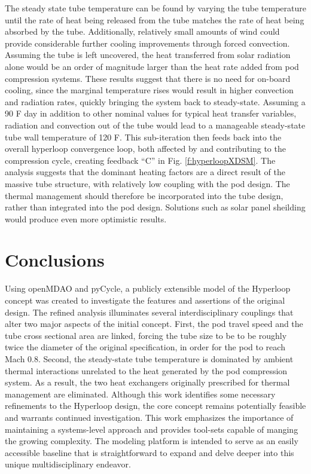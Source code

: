 \documentclass[heading.tex]{subfiles}
\begin{document}
The steady state tube temperature can be found by varying the tube temperature until the
rate of heat being released from the tube matches the rate of heat being absorbed by the tube.
Additionally, relatively small amounts of wind could provide
considerable further cooling improvements through forced convection.
Assuming the tube is left uncovered, the heat transferred from solar radiation alone would be an order of
magnitude larger than the heat rate added from pod compression systems.
These results suggest that there is no need for on-board cooling, since the marginal temperature
rises would result in higher convection and radiation rates, quickly bringing the system back to steady-state.
Assuming a 90 \degree F day in addition to other nominal values for typical heat transfer variables,
radiation and convection out of the tube would lead to a manageable steady-state tube wall temperature of 120 \degree F.
This sub-iteration then feeds back into the overall hyperloop convergence loop, both affected by
and contributing to the compression cycle, creating feedback “C” in Fig. \ref{f:hyperloopXDSM}.
The analysis suggests that the dominant heating factors are a direct result of the massive tube structure,
with relatively low coupling with the pod design.
The thermal management should therefore be incorporated into the tube design, rather than integrated into the pod design.
Solutions such as solar panel sheilding would produce even more optimistic results.


\section{Conclusions}

Using openMDAO and pyCycle, a publicly extensible model of the Hyperloop concept was created 
to investigate the features and assertions of the original design. 
The refined analysis illuminates several
interdisciplinary couplings that alter two major aspects of the initial concept.
First, the pod travel speed and the tube cross sectional area are linked, forcing 
the tube size to be to be roughly twice the diameter of the original specification, in order for the 
pod to reach Mach 0.8. Second, the steady-state tube temperature is dominated by ambient thermal interactions
unrelated to the heat generated by the pod compression system.
As a result, the two heat exchangers originally prescribed for thermal management are eliminated.
Although this work identifies some necessary refinements to the Hyperloop design, the core 
concept remains potentially feasible and warrants continued investigation. 
This work emphasizes the importance of maintaining a systems-level approach
and provides tool-sets capable of manging the growing complexity.
The modeling platform is intended to serve as an easily accessible baseline that is straightforward to
expand and delve deeper into this unique multidisciplinary endeavor.
\end{document}
